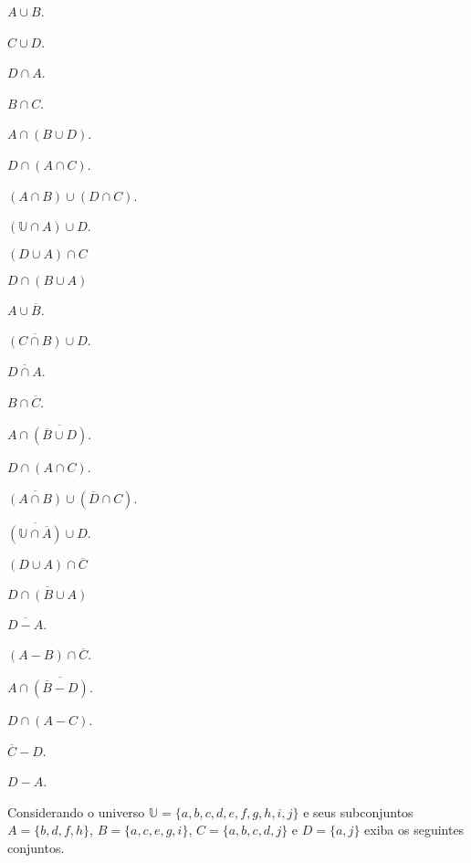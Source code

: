 \begin{exerList}
	\item $A \cup B$.
	\item $C \cup D$.
	\item $D \cap A$.
	\item $B \cap C$.
	\item $A \cap (B \cup D)$.
	\item $D \cap (A \cap C)$.
	\item $(A \cap B) \cup (D \cap C)$.
	\item $(\mathbb{U} \cap A) \cup D$.
	\item $(D \cup A) \cap C$
	\item $D \cap (B \cup A)$
	\item $A \cup \overline{B}$.
	\item $\overline{(C \cap B)} \cup D$.
	\item $\overline{D \cap A}$.
	\item $B \cap \overline{C}$.
	\item $A \cap \overline{(\overline{B} \cup D)}$.
	\item $D \cap (A \cap C)$.
	\item $\overline{(A \cap B)} \cup (\overline{D} \cap C)$.
	\item $\overline{(\mathbb{U} \cap \overline{A})} \cup D$.
	\item $(D \cup A) \cap \overline{C}$
	\item $\overline{D \cap (B \cup A)}$
	\item $\overline{D - A}$.
	\item $(A - B) \cap \overline{C}$.
	\item $A \cap \overline{(\overline{B} - D)}$.
	\item $D \cap (A - C)$.
	\item $\overline{C} - D$.
	\item $D - A$.
\end{exerList}

\begin{problem}\label{prob:Conjuntos10}
	Considerando o universo $\mathbb{U} = \{a, b, c, d, e, f, g, h, i, j\}$ e seus subconjuntos $A = \{b, d, f, h\}$, $B = \{a, c, e, g, i\}$, $C = \{a, b, c, d, j\}$ e $D = \{a, j\}$ exiba os seguintes conjuntos.
\end{problem}


